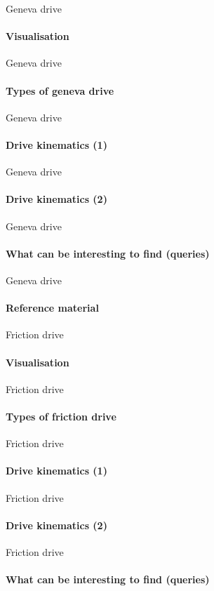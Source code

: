 \documentclass[aspectratio=169]{beamer}
\begin{document}
\begin{frame}[t]{Geneva drive}
    \framesubtitle{Visualisation}

\end{frame}

\begin{frame}[t]{Geneva drive}
    \framesubtitle{Types of geneva drive}

\end{frame}

\begin{frame}[t]{Geneva drive}
    \framesubtitle{Drive kinematics (1)}

\end{frame}

\begin{frame}[t]{Geneva drive}
    \framesubtitle{Drive kinematics (2)}

\end{frame}

\begin{frame}[t]{Geneva drive}
    \framesubtitle{What can be interesting to find (queries)}

\end{frame}

\begin{frame}[t]{Geneva drive}
    \framesubtitle{Reference material}

\end{frame}

\begin{frame}[t]{Friction drive}
    \framesubtitle{Visualisation}

\end{frame}

\begin{frame}[t]{Friction drive}
    \framesubtitle{Types of friction drive}

\end{frame}

\begin{frame}[t]{Friction drive}
    \framesubtitle{Drive kinematics (1)}

\end{frame}

\begin{frame}[t]{Friction drive}
    \framesubtitle{Drive kinematics (2)}

\end{frame}

\begin{frame}[t]{Friction drive}
    \framesubtitle{What can be interesting to find (queries)}

\end{frame}
\end{document}
